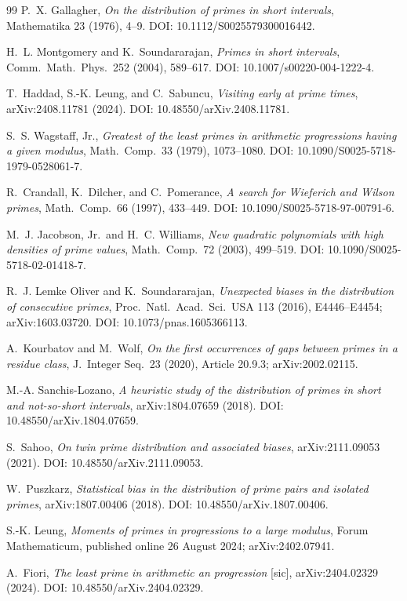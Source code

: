 \documentclass[11pt]{article}
\theoremstyle{definition}
\begin{document}
\begin{thebibliography}{99}
 P.~X. Gallagher,
\emph{On the distribution of primes in short intervals},
Mathematika 23 (1976), 4--9.  DOI: 10.1112/S0025579300016442.

 H.~L. Montgomery and K.~Soundararajan,
\emph{Primes in short intervals},
Comm.\ Math.\ Phys.\ 252 (2004), 589--617.
DOI: 10.1007/s00220-004-1222-4.

 T.~Haddad, S.-K. Leung, and C.~Sabuncu,
\emph{Visiting early at prime times}, arXiv:2408.11781 (2024).
DOI: 10.48550/arXiv.2408.11781.

 S.~S. Wagstaff, Jr.,
\emph{Greatest of the least primes in arithmetic progressions having a
given modulus}, Math.\ Comp.\ 33 (1979), 1073--1080.
DOI: 10.1090/S0025-5718-1979-0528061-7.

 R.~Crandall, K.~Dilcher, and C.~Pomerance,
\emph{A search for Wieferich and Wilson primes},
Math.\ Comp.\ 66 (1997), 433--449.
DOI: 10.1090/S0025-5718-97-00791-6.

 M.~J. Jacobson, Jr.\ and H.~C. Williams,
\emph{New quadratic polynomials with high densities of prime values},
Math.\ Comp.\ 72 (2003), 499--519.
DOI: 10.1090/S0025-5718-02-01418-7.

 R.~J. Lemke Oliver and K.~Soundararajan,
\emph{Unexpected biases in the distribution of consecutive primes},
Proc.\ Natl.\ Acad.\ Sci.\ USA 113 (2016), E4446--E4454;
arXiv:1603.03720.  DOI: 10.1073/pnas.1605366113.

 A.~Kourbatov and M.~Wolf,
\emph{On the first occurrences of gaps between primes in a residue
class}, J.~Integer Seq.\ 23 (2020), Article 20.9.3; arXiv:2002.02115.

 M.-A. Sanchis-Lozano,
\emph{A heuristic study of the distribution of primes in short and
not-so-short intervals}, arXiv:1804.07659 (2018).
DOI: 10.48550/arXiv.1804.07659.

 S.~Sahoo,
\emph{On twin prime distribution and associated biases},
arXiv:2111.09053 (2021).  DOI: 10.48550/arXiv.2111.09053.

 W.~Puszkarz,
\emph{Statistical bias in the distribution of prime pairs and isolated
primes}, arXiv:1807.00406 (2018).  DOI: 10.48550/arXiv.1807.00406.

 S.-K. Leung,
\emph{Moments of primes in progressions to a large modulus},
Forum Mathematicum, published online 26 August 2024;
arXiv:2402.07941.

 A.~Fiori,
\emph{The least prime in arithmetic an progression} [sic],
arXiv:2404.02329 (2024).  DOI: 10.48550/arXiv.2404.02329.


\end{thebibliography}
\end{document}
